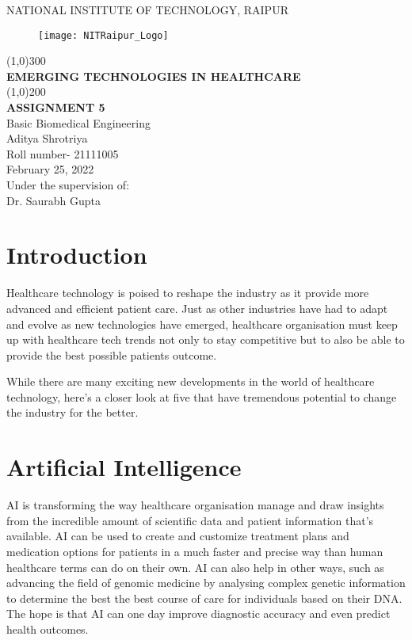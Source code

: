 \documentclass[12pt]{article}
\begin{document}
\begin{titlepage}
\begin{center}

\large{NATIONAL INSTITUTE OF TECHNOLOGY, RAIPUR}\\
[1.5mm]
\begin{figure}[h]
\centering
\texttt{[image: NITRaipur\_Logo]}
\end{figure}
\line(1,0){300}\\
[0.25in]
\LARGE{\bfseries EMERGING TECHNOLOGIES IN HEALTHCARE}\\
[2mm]
\line(1,0){200}\\
[0.25in]
\large{\bfseries ASSIGNMENT 5}\\
{Basic Biomedical Engineering}\\
[0.75cm]
\large{Aditya Shrotriya}\\
{Roll number- 21111005}\\
{February 25, 2022}\\
[1cm]
\large{Under the supervision of:}\\
{Dr. Saurabh Gupta}

\end{center}
\end{titlepage}
\clearpage
\tableofcontents
\clearpage

\section{Introduction}

Healthcare technology is poised to reshape the industry as it provide more advanced and efficient patient care. Just as other industries have had to adapt and evolve as new technologies have emerged, healthcare organisation must keep up with healthcare tech trends not only to stay competitive but to also be able to provide the best possible patients outcome.

While there are many exciting new developments in the world of healthcare technology, here's a closer look at five that have tremendous potential to change the industry for the better.

\section{Artificial Intelligence}

AI is transforming the way healthcare organisation manage and draw insights from the incredible amount of scientific data and patient information that's available. AI can be used to create and customize treatment plans and medication options for patients in a much faster and precise way than human healthcare terms can do on their own. AI can also help in other ways, such as advancing the field of genomic medicine by analysing complex genetic information to determine the best the best course of care for individuals based on their DNA. The hope is that AI can one day improve diagnostic accuracy and even predict health outcomes.
\end{document}
